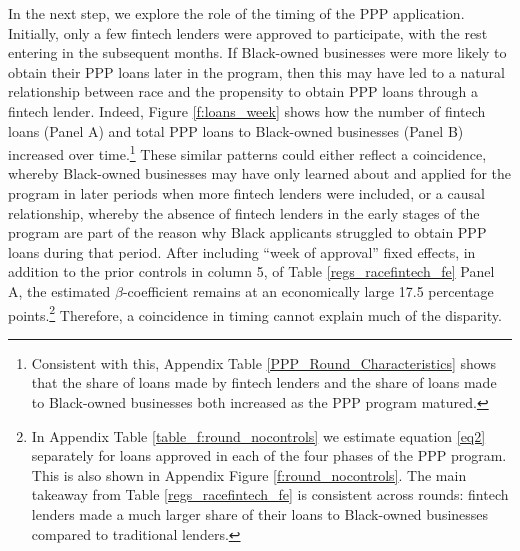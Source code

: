 \documentclass[11pt]{article}
\begin{document}
In the next step, we explore the role of the timing of the PPP application. Initially, only a few fintech lenders were approved to participate, with the rest entering in the subsequent months. If Black-owned businesses were more likely to obtain their PPP loans later in the program, then this may have led to a natural relationship between race and the propensity to obtain PPP loans through a fintech lender. Indeed, Figure \ref{f:loans_week}  shows how the number of fintech loans (Panel A) and total PPP loans to Black-owned businesses (Panel B) increased over time.\footnote{Consistent with this, Appendix Table \ref{PPP_Round_Characteristics} shows that the share of loans made by fintech lenders and the share of loans made to Black-owned businesses both increased as the PPP program matured.} These similar patterns could either reflect a coincidence, whereby Black-owned businesses may have only learned about and applied for the program in later periods when more fintech lenders were included, or a causal relationship, whereby the absence of fintech lenders in the early stages of the program are part of the reason why Black applicants struggled to obtain PPP loans during that period. After including ``week of approval'' fixed effects, in addition to the prior controls in column 5, of Table \ref{regs_racefintech_fe} Panel A, the estimated $\beta$-coefficient remains at an economically large 17.5 percentage points.\footnote{In Appendix Table \ref{table_f:round_nocontrols} we estimate equation \ref{eq2} separately for loans approved in each of the four phases of the PPP program. This is also shown in Appendix Figure \ref{f:round_nocontrols}.  The main takeaway from Table \ref{regs_racefintech_fe} is consistent across rounds: fintech lenders made a much larger share of their loans to Black-owned businesses compared to traditional lenders.} Therefore, a coincidence in timing cannot explain much of the disparity.
\end{document}
